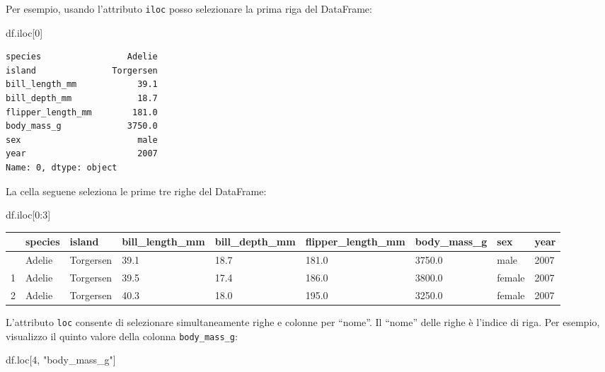 \documentclass[
  letterpaper,
  krantz2]{{[}./krantz{]}}
\newenvironment{Shaded}{\begin{snugshade}}{\end{snugshade}}
\newcommand{\DecValTok}[1]{\textcolor[rgb]{0.68,0.00,0.00}{#1}}
\newcommand{\NormalTok}[1]{\textcolor[rgb]{0.00,0.23,0.31}{#1}}
\newcommand{\StringTok}[1]{\textcolor[rgb]{0.13,0.47,0.30}{#1}}
\begin{document}
Per esempio, usando l'attributo \texttt{iloc} posso selezionare la prima
riga del DataFrame:

\begin{Shaded}
\begin{Highlighting}[]
\NormalTok{df.iloc[}\DecValTok{0}\NormalTok{]}
\end{Highlighting}
\end{Shaded}

\begin{verbatim}
species                 Adelie
island               Torgersen
bill_length_mm            39.1
bill_depth_mm             18.7
flipper_length_mm        181.0
body_mass_g             3750.0
sex                       male
year                      2007
Name: 0, dtype: object
\end{verbatim}

La cella seguene seleziona le prime tre righe del DataFrame:

\begin{Shaded}
\begin{Highlighting}[]
\NormalTok{df.iloc[}\DecValTok{0}\NormalTok{:}\DecValTok{3}\NormalTok{]}
\end{Highlighting}
\end{Shaded}

\begin{longtable}[]{@{}lllllllll@{}}
\toprule\noalign{}
& species & island & bill\_length\_mm & bill\_depth\_mm &
flipper\_length\_mm & body\_mass\_g & sex & year \\
\midrule\noalign{}
\endhead
\bottomrule\noalign{}
\endlastfoot
0 & Adelie & Torgersen & 39.1 & 18.7 & 181.0 & 3750.0 & male & 2007 \\
1 & Adelie & Torgersen & 39.5 & 17.4 & 186.0 & 3800.0 & female & 2007 \\
2 & Adelie & Torgersen & 40.3 & 18.0 & 195.0 & 3250.0 & female & 2007 \\
\end{longtable}

L'attributo \texttt{loc} consente di selezionare simultaneamente righe e
colonne per ``nome''. Il ``nome'' delle righe è l'indice di riga. Per
esempio, visualizzo il quinto valore della colonna
\texttt{body\_mass\_g}:

\begin{Shaded}
\begin{Highlighting}[]
\NormalTok{df.loc[}\DecValTok{4}\NormalTok{, }\StringTok{"body\_mass\_g"}\NormalTok{]}
\end{Highlighting}
\end{Shaded}
\end{document}
